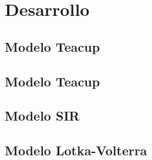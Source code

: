 \documentclass[11pt, a4paper]{article}
\begin{document}

\maketitle
\newpage

\tableofcontents
\newpage

%
% 
\section{Desarrollo}

\subsection{Modelo Teacup}

\subsection{Modelo Teacup}


\subsection{Modelo SIR}

\subsection{Modelo Lotka-Volterra}



%
% 
%
\end{document}

